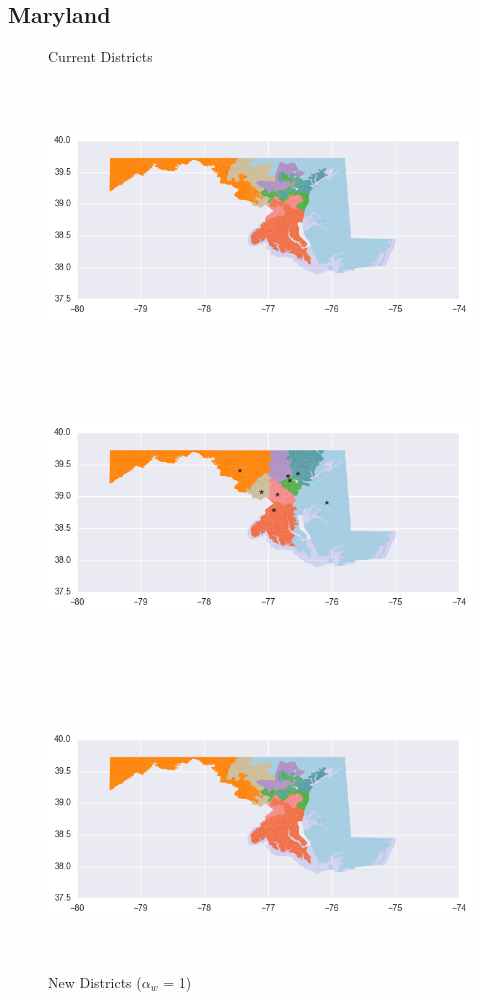\clearpage
\newpage

\subsection{Maryland}
\begin{figure}[htb!] \centering
\caption{ Current Districts }
\includegraphics[width=5in,height=3in,keepaspectratio]{../maps/MD/static/before.png}
\includegraphics[width=5in,height=3in,keepaspectratio]{../maps/MD/static/0_0_after.png}
\caption{ New Districts ($\alpha_w$ = 1) }
\includegraphics[width=5in,height=3in,keepaspectratio]{../maps/MD/static/before.png}

\end{figure}
